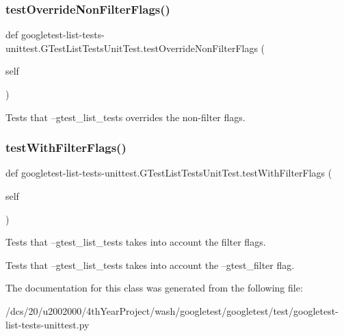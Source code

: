 \subsubsection{\texorpdfstring{test\+Override\+Non\+Filter\+Flags()}{testOverrideNonFilterFlags()}}
{\footnotesize\ttfamily def googletest-\/list-\/tests-\/unittest.\+G\+Test\+List\+Tests\+Unit\+Test.\+test\+Override\+Non\+Filter\+Flags (\begin{DoxyParamCaption}\item[{}]{self }\end{DoxyParamCaption})}

\begin{DoxyVerb}Tests that --gtest_list_tests overrides the non-filter flags.\end{DoxyVerb}
 \mbox{\label{classgoogletest-list-tests-unittest_1_1GTestListTestsUnitTest_adb60d2295fee8ed4af2a5ee1a32e5778}} 
\subsubsection{\texorpdfstring{test\+With\+Filter\+Flags()}{testWithFilterFlags()}}
{\footnotesize\ttfamily def googletest-\/list-\/tests-\/unittest.\+G\+Test\+List\+Tests\+Unit\+Test.\+test\+With\+Filter\+Flags (\begin{DoxyParamCaption}\item[{}]{self }\end{DoxyParamCaption})}

\begin{DoxyVerb}Tests that --gtest_list_tests takes into account the filter flags.

Tests that --gtest_list_tests takes into account the
--gtest_filter flag.
\end{DoxyVerb}
 

The documentation for this class was generated from the following file\+:\begin{DoxyCompactItemize}
\item 
/dcs/20/u2002000/4th\+Year\+Project/wash/googletest/googletest/test/googletest-\/list-\/tests-\/unittest.\+py\end{DoxyCompactItemize}
